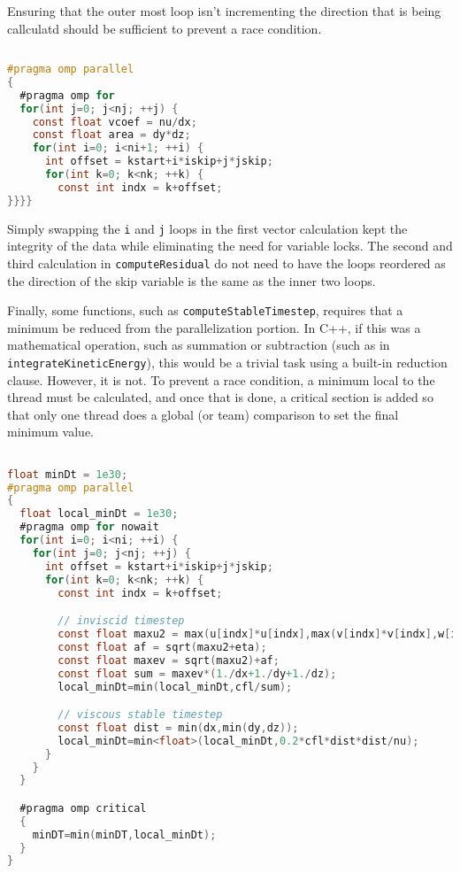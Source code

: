 \documentclass{article}
\begin{document}
  Ensuring that the outer most loop isn't incrementing the direction that is
  being callculatd should be sufficient to prevent a race condition.

  \begin{lstlisting}[language=C, 
                     linewidth=1\textwidth,
                     breaklines=true, 
                     basicstyle=\small\ttfamily]
                     
#pragma omp parallel
{
  #pragma omp for
  for(int j=0; j<nj; ++j) {
    const float vcoef = nu/dx;
    const float area = dy*dz;
    for(int i=0; i<ni+1; ++i) {
      int offset = kstart+i*iskip+j*jskip;
      for(int k=0; k<nk; ++k) {
        const int indx = k+offset;
}}}}

  \end{lstlisting}

  Simply swapping the \verb|i| and \verb|j| loops in the first vector
  calculation kept the integrity of the data while eliminating the need for
  variable locks. The second and third calculation in \verb|computeResidual| do
  not need to have the loops reordered as the direction of the skip variable is
  the same as the inner two loops.

  Finally, some functions, such as \verb|computeStableTimestep|, requires that
  a minimum be reduced from the parallelization portion. In C++, if this was a
  mathematical operation, such as summation or subtraction (such as in
  \verb|integrateKineticEnergy|), this would be a trivial task using a built-in
  reduction clause. However, it is not. To prevent a race condition, a minimum
  local to the thread must be calculated, and once that is done, a critical
  section is added so that only one thread does a global (or team) comparison
  to set the final minimum value.

  \begin{lstlisting}[language=C, 
                     linewidth=1\textwidth,
                     breaklines=true, 
                     basicstyle=\small\ttfamily]

float minDt = 1e30;
#pragma omp parallel
{
  float local_minDt = 1e30;
  #pragma omp for nowait
  for(int i=0; i<ni; ++i) {
    for(int j=0; j<nj; ++j) {
      int offset = kstart+i*iskip+j*jskip;
      for(int k=0; k<nk; ++k) {
        const int indx = k+offset;

        // inviscid timestep
        const float maxu2 = max(u[indx]*u[indx],max(v[indx]*v[indx],w[indx]*w[indx]));
        const float af = sqrt(maxu2+eta);
        const float maxev = sqrt(maxu2)+af;
        const float sum = maxev*(1./dx+1./dy+1./dz);
        local_minDt=min(local_minDt,cfl/sum);

        // viscous stable timestep
        const float dist = min(dx,min(dy,dz));
        local_minDt=min<float>(local_minDt,0.2*cfl*dist*dist/nu);
      }
    }
  }

  #pragma omp critical
  {
    minDT=min(minDT,local_minDt);
  }
}
    
  \end{lstlisting}
\end{document}
